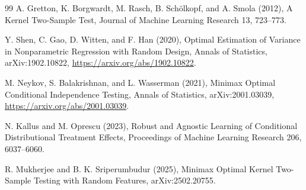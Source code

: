 \documentclass{article}
\begin{document}
\begin{thebibliography}{99}
   A. Gretton, K. Borgwardt, M. Rasch, B. Schölkopf, and A. Smola (2012), A Kernel Two-Sample Test, Journal of Machine Learning Research 13, 723--773.

   Y. Shen, C. Gao, D. Witten, and F. Han (2020), Optimal Estimation of Variance in Nonparametric Regression with Random Design, Annals of Statistics, arXiv:1902.10822, \url{https://arxiv.org/abs/1902.10822}.

   M. Neykov, S. Balakrishnan, and L. Wasserman (2021), Minimax Optimal Conditional Independence Testing, Annals of Statistics, arXiv:2001.03039, \url{https://arxiv.org/abs/2001.03039}.

   N. Kallus and M. Oprescu (2023), Robust and Agnostic Learning of Conditional Distributional Treatment Effects, Proceedings of Machine Learning Research 206, 6037--6060.

   R. Mukherjee and B. K. Sriperumbudur (2025), Minimax Optimal Kernel Two-Sample Testing with Random Features, arXiv:2502.20755.

\end{thebibliography}
\end{document}
